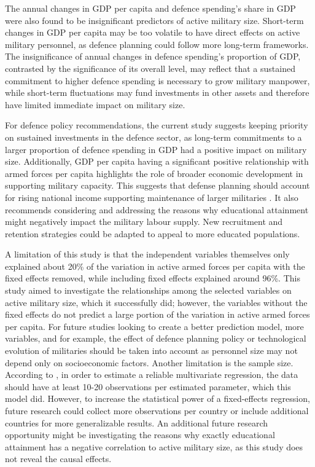 The annual changes in GDP per capita and defence spending's share in GDP were also found to be 
insignificant predictors of active military size. Short-term changes in GDP per capita may be 
too volatile to have direct effects on active military personnel, as defence planning could 
follow more long-term frameworks. The insignificance of annual changes in defence spending's 
proportion of GDP, contrasted by the significance of its overall level, may 
reflect that a sustained commitment to higher defence spending is 
necessary to grow military manpower, while short-term fluctuations may fund
investments in other assets and therefore have limited immediate impact on military size.

For defence policy recommendations, the current study suggests keeping priority on sustained 
investments in the defence sector, as long-term commitments to a larger proportion of defence 
spending in GDP had a positive impact on military size. 
Additionally, GDP per capita having a significant positive relationship 
with armed forces per capita highlights the role of broader economic development in 
supporting military capacity. This suggests that defense planning should account for 
rising national income supporting maintenance of larger militaries .
It also recommends considering and 
addressing the reasons why educational attainment might negatively impact the military labour supply. 
New recruitment and retention strategies could be adapted to appeal to more educated 
populations.

A limitation of this study is that the independent variables themselves only explained about 
20\% of the variation in active armed forces per capita with the fixed effects removed, 
while including fixed effects explained around 96\%.
This study aimed to investigate the relationships among the selected variables on 
active military size, which it successfully did; however, the variables without the fixed effects 
do not predict a large portion of the variation in  
active armed forces per capita. For future studies looking to create a better prediction model, 
more variables, and for example, the effect of defence planning policy or technological evolution of militaries 
should be taken into account as 
personnel size may not depend only on socioeconomic factors.
Another limitation is the sample size. According to \textcite{harrell_multivariable_2015},
in order to estimate a reliable multivariate regression, the data should have at least 
10-20 observations per estimated parameter, which this model did. 
However, to increase the statistical 
power of a fixed-effects regression, 
future research could collect more observations per country or 
include additional countries for more generalizable results.
An additional future research opportunity might be investigating the reasons why exactly educational 
attainment has a negative correlation to active military size, as this study does not reveal 
the causal effects.


